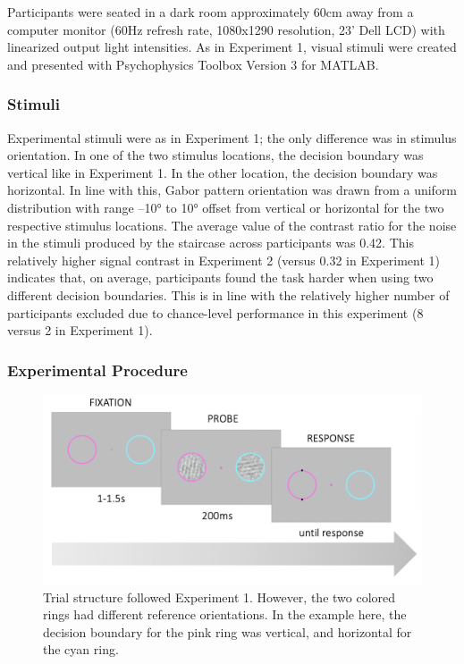 \documentclass[a4paper, nobind]{templates/ociamthesis}
\begin{document}
Participants were seated in a dark room approximately 60cm away from a computer monitor (60Hz refresh rate, 1080x1290 resolution, 23' Dell LCD) with linearized output light intensities. As in Experiment 1, visual stimuli were created and presented with Psychophysics Toolbox Version 3 \autocite[PsychToolbox-3,][]{brainard1997} for MATLAB.

\hypertarget{stimuli-1}{%
\subsubsection{Stimuli}\label{stimuli-1}}

Experimental stimuli were as in Experiment 1; the only difference was in stimulus orientation. In one of the two stimulus locations, the decision boundary was vertical like in Experiment 1. In the other location, the decision boundary was horizontal. In line with this, Gabor pattern orientation was drawn from a uniform distribution with range --10° to 10° offset from vertical or horizontal for the two respective stimulus locations. The average value of the contrast ratio for the noise in the stimuli produced by the staircase across participants was 0.42. This relatively higher signal contrast in Experiment 2 (versus 0.32 in Experiment 1) indicates that, on average, participants found the task harder when using two different decision boundaries. This is in line with the relatively higher number of participants excluded due to chance-level performance in this experiment (8 versus 2 in Experiment 1).

\hypertarget{experimental-procedure-1}{%
\subsubsection{Experimental Procedure}\label{experimental-procedure-1}}

\begin{figure}

{\centering \includegraphics[width=1\linewidth]{figures/distr-trial-b} 

}

\caption[Experiment 2, Trial structure]{Trial structure followed Experiment 1. However, the two colored rings had different reference orientations. In the example here, the decision boundary for the pink ring was vertical, and horizontal for the cyan ring.}\label{fig:distr-trial-b}
\end{figure}
\end{document}
